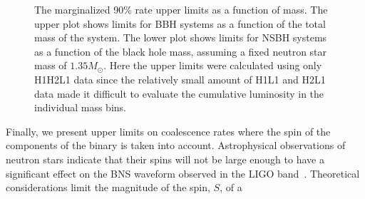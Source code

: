 \begin{figure}[ht]
  \caption{The marginalized 90\% rate upper limits as a function of mass.  The
upper plot shows limits for BBH systems as a function of the
total mass of the system.  The lower plot shows limits for NSBH
systems as a function of the black hole mass, assuming a fixed
neutron star mass of $1.35 M_{\odot}$. Here the upper limits were 
calculated using only H1H2L1 data since the relatively small amount
of H1L1 and H2L1 data made it difficult to 
evaluate the cumulative luminosity in the individual mass bins.} 
  \label{fig:ulmass}
\end{figure}
Finally, we present upper limits on coalescence rates where the spin of
the components of the binary is taken into account.  Astrophysical
observations of neutron stars indicate that their spins will not be
large enough to have a significant effect on the BNS waveform
observed in the LIGO band~\cite{ATNF:psrcat,Apostolatos:1994}.
Theoretical considerations limit the magnitude of the spin, $S$, of a
